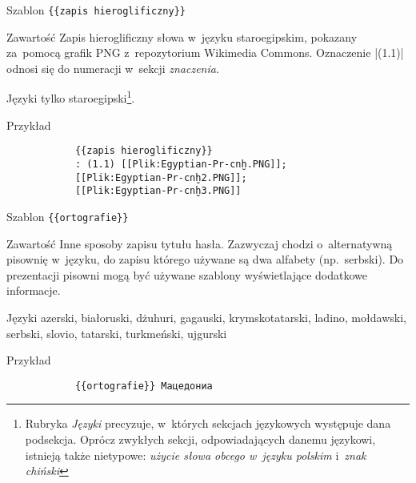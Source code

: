 \label{wikt:subsections}
\begin{opis}
	\item[Szablon] \verb|{{zapis hieroglificzny}}|
	\item[Zawartość] Zapis hieroglificzny słowa w~języku staroegipskim, pokazany za~pomocą grafik PNG z~repozytorium Wikimedia Commons. Oznaczenie \kod|(1.1)| odnosi się do numeracji w~sekcji \emph{znaczenia}.
	\item[Języki] tylko staroegipski\footnote{Rubryka \emph{Języki} precyzuje, w~których sekcjach językowych występuje dana podsekcja. Oprócz zwykłych sekcji, odpowiadających danemu językowi, istnieją także nietypowe: \emph{użycie słowa obcego w~języku polskim} i~\emph{znak chiński}}.
	\item[Przykład]
		\begin{verbatim}
			{{zapis hieroglificzny}}
			: (1.1) [[Plik:Egyptian-Pr-cnḫ.PNG]];
			[[Plik:Egyptian-Pr-cnḫ2.PNG]];
			[[Plik:Egyptian-Pr-cnḫ3.PNG]]
		\end{verbatim}
\end{opis}
\spacer
\begin{opis}
	\item[Szablon] \verb|{{ortografie}}|
	\item[Zawartość] Inne sposoby zapisu tytułu hasła. Zazwyczaj chodzi o~alternatywną pisownię w~języku, do zapisu którego używane są dwa alfabety (np.\ serbski). Do prezentacji pisowni mogą być używane szablony wyświetlające dodatkowe informacje.
	\item[Języki] azerski, białoruski, dżuhuri, gagauski, krymskotatarski, ladino, mołdawski, serbski, slovio, tatarski, turkmeński, ujgurski
	\item[Przykład]
		\begin{verbatim}
			{{ortografie}} Мацедониа
		\end{verbatim}
\end{opis}
\spacer
